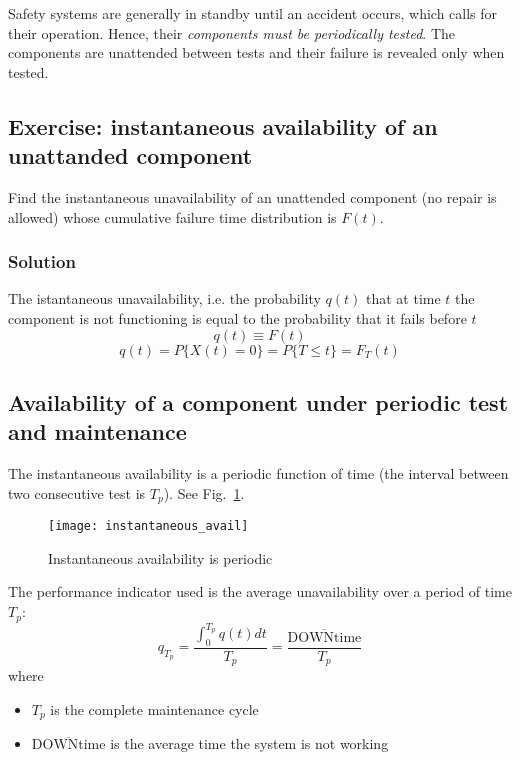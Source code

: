 Safety systems are generally in standby until an accident occurs, which calls
for their operation. Hence, their \emph{components must be periodically tested}.
The components are unattended between tests and their failure is revealed only
when tested.

\subsection{Exercise: instantaneous availability of an unattanded component}
Find the instantaneous unavailability of an unattended component (no repair is
allowed) whose cumulative failure time distribution is $F(t)$.

\subsubsection*{Solution}
The istantaneous unavailability, i.e. the probability $q(t)$ that at time $t$
the component is not functioning is equal to the probability that it fails
before $t$
\begin{equation*}
    q(t) \equiv F(t)
\end{equation*}
\begin{equation*}
    q(t) = P\{X(t) = 0\} = P\{T\le t\} = F_T(t)
\end{equation*}

\subsection{Availability of a component under periodic test and maintenance}
The instantaneous availability is a periodic function of time (the interval
between two consecutive test is $T_p$). See Fig.~\ref{fig:instantaneous_avail}.

\begin{figure}[!htp]
    \centering
    \texttt{[image: instantaneous\_avail]}
    \caption{Instantaneous availability is periodic}
    \label{fig:instantaneous_avail}
\end{figure}

The performance indicator used is the average unavailability over a period of
time $T_p$:
\begin{equation*}
    q_{T_p} = \frac{\int_0^{T_p}q(t)dt}{T_p} = \frac{\overline{\text{DOWNtime}}}{T_p}
\end{equation*}
where
\begin{itemize}
    \item $T_p$ is the complete maintenance cycle
    \item $\overline{\text{DOWNtime}}$ is the average time the system is not working
\end{itemize}


